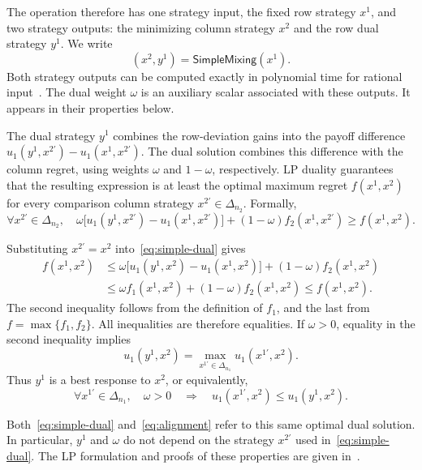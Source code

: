 \documentclass[11pt]{article}
\theoremstyle{remark}
\theoremstyle{plain}
\newcommand{\sm}{\mathsf{SimpleMixing}}
\begin{document}
The operation therefore has one strategy input, the fixed row
strategy $x^1$, and two strategy outputs: the minimizing column
strategy $x^2$ and the row dual strategy $y^1$. We write
\[
 (x^2,y^1)=\sm(x^1).
\]
Both strategy outputs can be computed exactly in polynomial time for
rational input~\cite{automating2025}.
The dual weight $\omega$ is an auxiliary scalar associated with these
outputs. It appears in their properties below.

The dual strategy $y^1$ combines the row-deviation gains into the
payoff difference $u_1(y^1,x^{2\prime})-u_1(x^1,x^{2\prime})$.
The dual solution combines this difference with the column regret,
using weights $\omega$ and $1-\omega$, respectively.
LP duality guarantees that the resulting expression is at least the
optimal maximum regret $f(x^1,x^2)$ for every comparison column
strategy $x^{2\prime}\in\Delta_{n_2}$. Formally,
\begin{equation}
 \forall x^{2\prime}\in\Delta_{n_2},\quad
 \omega\bigl[u_1(y^1,x^{2\prime})-u_1(x^1,x^{2\prime})\bigr]
 +(1-\omega)f_2(x^1,x^{2\prime})\ge f(x^1,x^2).
 \label{eq:simple-dual}
\end{equation}

Substituting $x^{2\prime}=x^2$ into~\eqref{eq:simple-dual} gives
\[
 \begin{aligned}
 f(x^1,x^2)
  &\le\omega\bigl[u_1(y^1,x^2)-u_1(x^1,x^2)\bigr]
          +(1-\omega)f_2(x^1,x^2)\\
  &\le\omega f_1(x^1,x^2)+(1-\omega)f_2(x^1,x^2)
   \le f(x^1,x^2).
 \end{aligned}
\]
The second inequality follows from the definition of $f_1$, and the
last from $f=\max\{f_1,f_2\}$. All inequalities are therefore
equalities. If $\omega>0$, equality in the second inequality implies
\[
 u_1(y^1,x^2)=\max_{x^{1\prime}\in\Delta_{n_1}}u_1(x^{1\prime},x^2).
\]
Thus $y^1$ is a best response to $x^2$, or equivalently,
\begin{equation}
 \forall x^{1\prime}\in\Delta_{n_1},\quad
 \omega>0\quad\Longrightarrow\quad
 u_1(x^{1\prime},x^2)\le u_1(y^1,x^2).
 \label{eq:alignment}
\end{equation}

Both~\eqref{eq:simple-dual} and~\eqref{eq:alignment} refer to this
same optimal dual solution. In particular, $y^1$ and $\omega$ do not
depend on the strategy $x^{2\prime}$ used in~\eqref{eq:simple-dual}.
The LP formulation and proofs of these properties are given
in~\cite{automating2025}.
\end{document}
